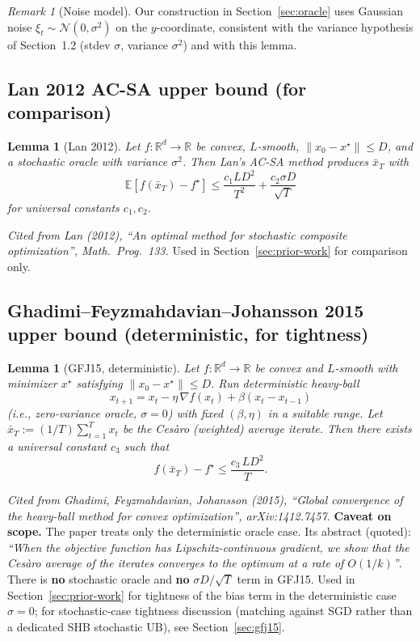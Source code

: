 \documentclass[11pt]{article}
\newtheorem{lemma}[theorem]{Lemma}
\theoremstyle{definition}
\theoremstyle{remark}
\newtheorem{remark}[theorem]{Remark}
\begin{document}
\begin{remark}[Noise model]
Our construction in Section~\ref{sec:oracle} uses Gaussian noise $\xi_t \sim \mathcal{N}(0, \sigma^2)$ on the $y$-coordinate, consistent with the variance hypothesis of Section~1.2 (stdev $\sigma$, variance $\sigma^2$) and with this lemma.
\end{remark}

\subsection{Lan 2012 AC-SA upper bound (for comparison)}

\begin{lemma}[Lan 2012]
\label{lem:lan}
Let $f : \mathbb{R}^d \to \mathbb{R}$ be convex, $L$-smooth, $\|x_0 - x^\star\|\leq D$, and a stochastic oracle with variance $\sigma^2$. Then Lan's AC-SA method produces $\bar x_T$ with
\[
  \mathbb{E}[f(\bar x_T) - f^\star] \leq \frac{c_1 L D^2}{T^2} + \frac{c_2 \sigma D}{\sqrt T}
\]
for universal constants $c_1, c_2$.
\end{lemma}

\textit{Cited from Lan (2012), ``An optimal method for stochastic composite optimization'', Math.\ Prog.\ 133.} Used in Section~\ref{sec:prior-work} for comparison only.

\subsection{Ghadimi--Feyzmahdavian--Johansson 2015 upper bound (deterministic, for tightness)}

\begin{lemma}[GFJ15, deterministic]
\label{lem:gfj15}
Let $f:\mathbb{R}^d \to \mathbb{R}$ be convex and $L$-smooth with minimizer $x^\star$ satisfying $\|x_0 - x^\star\|\leq D$. Run \emph{deterministic} heavy-ball
\[
  x_{t+1} = x_t - \eta\,\nabla f(x_t) + \beta(x_t - x_{t-1})
\]
(i.e., zero-variance oracle, $\sigma = 0$) with fixed $(\beta,\eta)$ in a suitable range. Let $\bar x_T := (1/T)\sum_{t=1}^T x_t$ be the Ces\`aro (weighted) average iterate. Then there exists a universal constant $c_3$ such that
\[
  f(\bar x_T) - f^\star \leq \frac{c_3\, L D^2}{T}.
\]
\end{lemma}

\textit{Cited from Ghadimi, Feyzmahdavian, Johansson (2015), ``Global convergence of the heavy-ball method for convex optimization'', arXiv:1412.7457.} \textbf{Caveat on scope.} The paper treats only the deterministic oracle case. Its abstract (quoted): \emph{``When the objective function has Lipschitz-continuous gradient, we show that the Ces\`aro average of the iterates converges to the optimum at a rate of $O(1/k)$''}. There is \textbf{no} stochastic oracle and \textbf{no} $\sigma D/\sqrt T$ term in GFJ15. Used in Section~\ref{sec:prior-work} for tightness of the bias term in the deterministic case $\sigma = 0$; for stochastic-case tightness discussion (matching against SGD rather than a dedicated SHB stochastic UB), see Section~\ref{sec:gfj15}.
\end{document}
